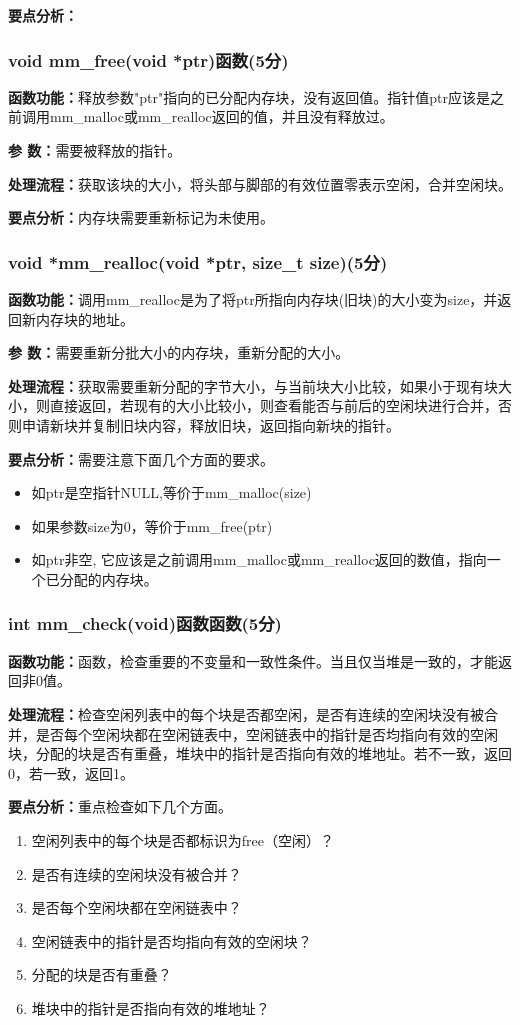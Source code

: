 \textbf{要点分析：}
\subsubsection{void mm\_free(void *ptr)函数(5分)}
\textbf{函数功能：}释放参数"ptr"指向的已分配内存块，没有返回值。指针值ptr应该是之前调用mm\_malloc或mm\_realloc返回的值，并且没有释放过。

\textbf{参   数：}需要被释放的指针。

\textbf{处理流程：}获取该块的大小，将头部与脚部的有效位置零表示空闲，合并空闲块。

\textbf{要点分析：}内存块需要重新标记为未使用。

\subsubsection{void *mm\_realloc(void *ptr, size\_t size)(5分)}
\textbf{函数功能：}调用mm\_realloc是为了将ptr所指向内存块(旧块)的大小变为size，并返回新内存块的地址。

\textbf{参   数：}需要重新分批大小的内存块，重新分配的大小。

\textbf{处理流程：}获取需要重新分配的字节大小，与当前块大小比较，如果小于现有块大小，则直接返回，若现有的大小比较小，则查看能否与前后的空闲块进行合并，否则申请新块并复制旧块内容，释放旧块，返回指向新块的指针。

\textbf{要点分析：}需要注意下面几个方面的要求。
\begin{itemize}
    \item 如ptr是空指针NULL,等价于mm\_malloc(size)
    \item 如果参数size为0，等价于mm\_free(ptr)
    \item 如ptr非空, 它应该是之前调用mm\_malloc或mm\_realloc返回的数值，指向一个已分配的内存块。
\end{itemize}
\subsubsection{int mm\_check(void)函数函数(5分)}
\textbf{函数功能：}函数，检查重要的不变量和一致性条件。当且仅当堆是一致的，才能返回非0值。

\textbf{处理流程：}检查空闲列表中的每个块是否都空闲，是否有连续的空闲块没有被合并，是否每个空闲块都在空闲链表中，空闲链表中的指针是否均指向有效的空闲块，分配的块是否有重叠，堆块中的指针是否指向有效的堆地址。若不一致，返回0，若一致，返回1。

\textbf{要点分析：}重点检查如下几个方面。
\begin{enumerate}
    \item 空闲列表中的每个块是否都标识为free（空闲）？
    \item 是否有连续的空闲块没有被合并？
    \item 是否每个空闲块都在空闲链表中？
    \item 空闲链表中的指针是否均指向有效的空闲块？
    \item 分配的块是否有重叠？
    \item 堆块中的指针是否指向有效的堆地址？
\end{enumerate}

